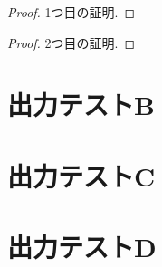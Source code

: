 \documentclass[uplatex, dvipdfmx, a4paper, 12pt, class=jsbook, crop=false]{standalone}
\begin{document}
\begin{proposition}
	\label{prop:test-prop-A}
	\lipsum[1][2]
\end{proposition}

\begin{proof}
	\label{pf:test-proof-A}
	1つ目の証明.
\end{proof}

\begin{proof}
	\label{pf:test-proof-B}
	2つ目の証明.
\end{proof}

\begin{problem}
	\label{prob:test-problem-A}
	\lipsum[1][2]
\end{problem}

\section{出力テストB}
\label{sec:test-B}
\lipsum[2-3]

\section{出力テストC}
\label{sec:test-C}
\lipsum[4][1]

\section{出力テストD}
\label{sec:test-D}
\lipsum[4][1-3]
\end{document}
